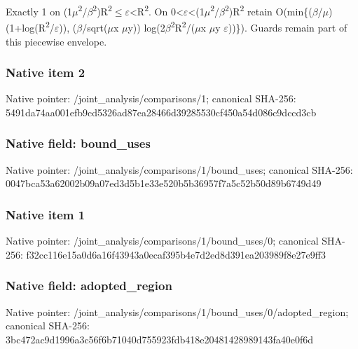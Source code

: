 \documentclass[10pt,a4paper]{article}
\begin{document}
Exactly 1 on (1\ensuremath{\mu}\textsuperscript{2}/\ensuremath{\beta}\textsuperscript{2})R\textsuperscript{2}\ensuremath{\le}\ensuremath{\varepsilon}<R\textsuperscript{2}. On 0<\ensuremath{\varepsilon}<(1\ensuremath{\mu}\textsuperscript{2}/\ensuremath{\beta}\textsuperscript{2})R\textsuperscript{2} retain O(min\{(\ensuremath{\beta}/\ensuremath{\mu})(1+log(R\textsuperscript{2}/\ensuremath{\varepsilon})), (\ensuremath{\beta}/sqrt(\ensuremath{\mu}x \ensuremath{\mu}y)) log(2\ensuremath{\beta}\textsuperscript{2}R\textsuperscript{2}/(\ensuremath{\mu}x \ensuremath{\mu}y \ensuremath{\varepsilon}))\}). Guards remain part of this piecewise envelope.


\subsubsection{Native item 2}


Native pointer: /joint\_analysis/comparisons/1; canonical SHA-256: 5491da74aa001efb9cd5326a\allowbreak{}d87ea28466d39285530cf450\allowbreak{}a54d086c9dccd3cb



\subsubsection{Native field: bound\_uses}


Native pointer: /joint\_analysis/comparis\allowbreak{}ons/1/bound\_uses; canonical SHA-256: 0047bca53a62002b09a07ed3\allowbreak{}d5b1e33e520b5b36957f7a5c\allowbreak{}52b50d89b6749d49



\subsubsection{Native item 1}


Native pointer: /joint\_analysis/comparis\allowbreak{}ons/1/bound\_uses/0; canonical SHA-256: f32cc116e15a0d6a16f43943\allowbreak{}a0ecaf395b4e7d2ed8d391ea\allowbreak{}203989f8e27e9ff3



\subsubsection{Native field: adopted\_region}


Native pointer: /joint\_analysis/comparis\allowbreak{}ons/1/bound\_uses/0/adopt\allowbreak{}ed\_region; canonical SHA-256: 3bc472ac9d1996a3c56f6b71\allowbreak{}040d755923fdb418e2048142\allowbreak{}8989143fa40e0f6d
\end{document}

